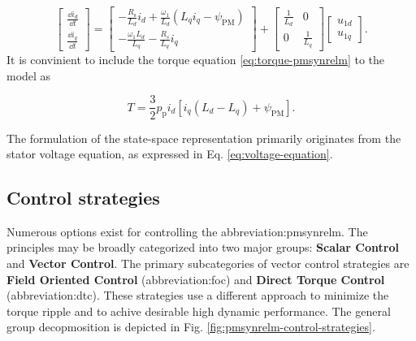 \documentclass[a4paper, twoside, 11pt]{article}
\begin{document}
    \begin{equation}\label{eq:mathematical-model-pmsynrelm}
     \begin{bmatrix}
        \frac{\dd i_d}{\dd t} \\
         \frac{\dd i_q}{\dd t}
     \end{bmatrix}
        =
     \begin{bmatrix}
         - \frac{R_\mathrm{s}}{L_d}i_d + \frac{\omega_1}{L_d}(L_q i_q - \psi_\mathrm{PM})\\
         - \frac{\omega_1 L_d}{L_q} - \frac{R_s}{L_q} i_q
     \end{bmatrix}
        +
     \begin{bmatrix}
        \frac{1}{L_d} & 0\\
         0 & \frac{1}{L_q}
     \end{bmatrix}
     \begin{bmatrix}
         u_{1d}\\
         u_{1q}
     \end{bmatrix}.
    \end{equation}
    It is convinient to include the torque equation \ref{eq:torque-pmsynrelm} to the model as

    \begin{equation}
        T = \frac{3}{2} p_\mathrm{p} i_d \left[ i_q (L_d - L_q) + \psi_{\mathrm{PM}} \right].
    \end{equation}

    
    \par

    The formulation of the state-space representation primarily originates from the stator voltage equation, as expressed in Eq. \ref{eq:voltage-equation}.

    \subsection{Control strategies}

        Numerous options exist for controlling the \gls{abbreviation:pmsynrelm}. The principles may be broadly categorized into two major groups: \textbf{Scalar Control} and \textbf{Vector Control}. The primary subcategories of vector control strategies are \textbf{Field Oriented Control} (\gls{abbreviation:foc}) and \textbf{Direct Torque Control} (\gls{abbreviation:dtc}). These strategies use a different approach to minimize the torque ripple and to achive desirable high dynamic performance. \cite{dwivedi-review-on-control-strategies-of-permanent-magnet-assisted-synchronous-reluctance-motor-drive} The general group decopmosition is depicted in Fig. \ref{fig:pmsynrelm-control-strategies}.
\end{document}
